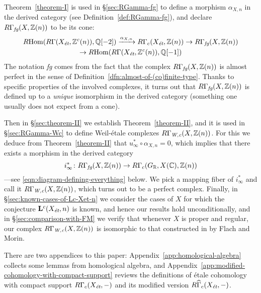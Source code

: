 \documentclass[leqno,12pt]{article}
\theoremstyle{plain}
\theoremstyle{definition}
\DeclareMathOperator{\Hom}{Hom}
\newcommand{\CC}{\mathbb{C}}
\newcommand{\QQ}{\mathbb{Q}}
\newcommand{\RR}{\mathbb{R}}
\newcommand{\ZZ}{\mathbb{Z}}
\newcommand{\Wc}{\text{\it W,c}}
\newcommand{\et}{\text{\it \'{e}t}}
\newcommand{\fg}{\text{\it fg}}
\newcommand{\RHom}{R\!\Hom}
\begin{document}
Theorem~\ref{theorem-I} is used in \S\ref{sec:RGamma-fg} to define a morphism
$\alpha_{X,n}$ in the derived category (see Definition~\ref{def:RGamma-fg}),
and declare $R\Gamma_\fg (X, \ZZ(n))$ to be its cone:
\begin{multline*}
  \RHom (R\Gamma (X_\et, \ZZ^c (n)), \QQ [-2]) \xrightarrow{\alpha_{X,n}}
  R\Gamma_c (X_\et, \ZZ (n)) \to
  R\Gamma_\fg (X, \ZZ(n)) \\
  \to \RHom (R\Gamma (X_\et, \ZZ^c (n)), \QQ [-1])
\end{multline*}
The notation \emph{fg} comes from the fact that the complex
$R\Gamma_\fg (X, \ZZ(n))$ is almost perfect in the sense of
Definition~\ref{dfn:almost-of-(co)finite-type}. Thanks to specific properties
of the involved complexes, it turns out that $R\Gamma_\fg (X, \ZZ(n))$ is
defined up to a \emph{unique} isomorphism in the derived category (something one
usually does not expect from a cone).

Then in \S\ref{sec:theorem-II} we establish Theorem~\ref{theorem-II}, and it is
used in \S\ref{sec:RGamma-Wc} to define Weil-\'{e}tale complexes
$R\Gamma_\Wc (X, \ZZ(n))$. For this we deduce from Theorem~\ref{theorem-II} that
$u_\infty^* \circ \alpha_{X,n} = 0$, which implies that there exists a morphism
in the derived category
$$i_\infty^*\colon R\Gamma_\fg (X, \ZZ (n)) \to R\Gamma_c (G_\RR, X (\CC), \ZZ(n))$$
---see \eqref{eqn:diagram-defining-everything} below. We pick a mapping fiber of
$i_\infty^*$ and call it $R\Gamma_\Wc (X, \ZZ (n))$, which turns out to be a
perfect complex.  Finally, in \S\ref{sec:known-cases-of-Lc-Xet-n} we consider
the cases of $X$ for which the conjecture $\mathbf{L}^c (X_\et, n)$ is known,
and hence our results hold unconditionally, and in
\S\ref{sec:comparison-with-FM} we verify that whenever $X$ is proper and
regular, our complex $R\Gamma_\Wc (X, \ZZ (n))$ is isomorphic to that
constructed in \cite{Flach-Morin-2018} by Flach and Morin.

There are two appendices to this paper: Appendix~\ref{app:homological-algebra}
collects some lemmas from homological algebra, and
Appendix~\ref{app:modified-cohomology-with-compact-support} reviews the
definitions of \'{e}tale cohomology with compact support $R\Gamma_c (X_\et, -)$
and its modified version $R\widehat{\Gamma}_c (X_\et, -)$.

\vspace{1em}
\end{document}
